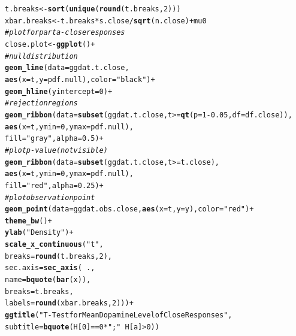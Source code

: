 \documentclass{article}\usepackage[]{graphicx}\usepackage[]{xcolor}
\makeatletter
\newcommand{\hlnum}[1]{\textcolor[rgb]{0.686,0.059,0.569}{#1}}%
\newcommand{\hlsng}[1]{\textcolor[rgb]{0.192,0.494,0.8}{#1}}%
\newcommand{\hlcom}[1]{\textcolor[rgb]{0.678,0.584,0.686}{\textit{#1}}}%
\newcommand{\hlopt}[1]{\textcolor[rgb]{0,0,0}{#1}}%
\newcommand{\hldef}[1]{\textcolor[rgb]{0.345,0.345,0.345}{#1}}%
\newcommand{\hlkwb}[1]{\textcolor[rgb]{0.69,0.353,0.396}{#1}}%
\newcommand{\hlkwc}[1]{\textcolor[rgb]{0.333,0.667,0.333}{#1}}%
\newcommand{\hlkwd}[1]{\textcolor[rgb]{0.737,0.353,0.396}{\textbf{#1}}}%
\newenvironment{kframe}{%
 \def\at@end@of@kframe{}%
 \ifinner\ifhmode%
  \def\at@end@of@kframe{\end{minipage}}%
  \begin{minipage}{\columnwidth}%
 \fi\fi%
 \def\FrameCommand##1{\hskip\@totalleftmargin \hskip-\fboxsep
 \colorbox{shadecolor}{##1}\hskip-\fboxsep
     \hskip-\linewidth \hskip-\@totalleftmargin \hskip\columnwidth}%
 \MakeFramed {\advance\hsize-\width
   \@totalleftmargin\z@ \linewidth\hsize
   \@setminipage}}%
 {\par\unskip\endMakeFramed%
 \at@end@of@kframe}
\newenvironment{knitrout}{}{} %
\makeatother
\begin{document}
\begin{enumerate}
\begin{enumerate}
\begin{knitrout}
\begin{kframe}
\begin{alltt}
\hldef{t.breaks} \hlkwb{<-} \hlkwd{sort}\hldef{(}\hlkwd{unique}\hldef{(}\hlkwd{round}\hldef{(t.breaks,} \hlnum{2}\hldef{)))}
\hldef{xbar.breaks} \hlkwb{<-} \hldef{t.breaks} \hlopt{*} \hldef{s.close}\hlopt{/}\hlkwd{sqrt}\hldef{(n.close)} \hlopt{+} \hldef{mu0}
\hlcom{#plot for part a - close responses}
\hldef{close.plot} \hlkwb{<-} \hlkwd{ggplot}\hldef{()} \hlopt{+}
\hlcom{# null distribution}
\hlkwd{geom_line}\hldef{(}\hlkwc{data}\hldef{=ggdat.t.close,}
          \hlkwd{aes}\hldef{(}\hlkwc{x}\hldef{=t,} \hlkwc{y}\hldef{=pdf.null),} \hlkwc{color} \hldef{=} \hlsng{"black"}\hldef{)}\hlopt{+}
\hlkwd{geom_hline}\hldef{(}\hlkwc{yintercept}\hldef{=}\hlnum{0}\hldef{)}\hlopt{+}
\hlcom{# rejection regions}
\hlkwd{geom_ribbon}\hldef{(}\hlkwc{data}\hldef{=}\hlkwd{subset}\hldef{(ggdat.t.close, t}\hlopt{>=}\hlkwd{qt}\hldef{(}\hlkwc{p} \hldef{=} \hlnum{1}\hlopt{-}\hlnum{0.05}\hldef{,} \hlkwc{df}\hldef{=df.close)),}
            \hlkwd{aes}\hldef{(}\hlkwc{x}\hldef{=t,} \hlkwc{ymin}\hldef{=}\hlnum{0}\hldef{,} \hlkwc{ymax}\hldef{=pdf.null),}
            \hlkwc{fill}\hldef{=}\hlsng{"gray"}\hldef{,} \hlkwc{alpha}\hldef{=}\hlnum{0.5}\hldef{)}\hlopt{+}
\hlcom{# plot p-value (not visible)}
\hlkwd{geom_ribbon}\hldef{(}\hlkwc{data}\hldef{=}\hlkwd{subset}\hldef{(ggdat.t.close, t}\hlopt{>=}\hldef{t.close),}
            \hlkwd{aes}\hldef{(}\hlkwc{x}\hldef{=t,} \hlkwc{ymin}\hldef{=}\hlnum{0}\hldef{,} \hlkwc{ymax}\hldef{=pdf.null),}
            \hlkwc{fill}\hldef{=}\hlsng{"red"}\hldef{,} \hlkwc{alpha}\hldef{=}\hlnum{0.25}\hldef{)}\hlopt{+}
\hlcom{# plot observation point}
\hlkwd{geom_point}\hldef{(}\hlkwc{data}\hldef{=ggdat.obs.close,} \hlkwd{aes}\hldef{(}\hlkwc{x}\hldef{=t,} \hlkwc{y}\hldef{=y),} \hlkwc{color}\hldef{=}\hlsng{"red"}\hldef{)}\hlopt{+}
\hlkwd{theme_bw}\hldef{()}\hlopt{+}
\hlkwd{ylab}\hldef{(}\hlsng{"Density"}\hldef{)}\hlopt{+}
\hlkwd{scale_x_continuous}\hldef{(}\hlsng{"t"}\hldef{,}
                   \hlkwc{breaks} \hldef{=} \hlkwd{round}\hldef{(t.breaks,}\hlnum{2}\hldef{),}
                   \hlkwc{sec.axis} \hldef{=} \hlkwd{sec_axis}\hldef{(}\hlopt{~}\hldef{.,}
                                       \hlkwc{name} \hldef{=} \hlkwd{bquote}\hldef{(}\hlkwd{bar}\hldef{(x)),}
                                       \hlkwc{breaks} \hldef{= t.breaks,}
                                       \hlkwc{labels} \hldef{=} \hlkwd{round}\hldef{(xbar.breaks,}\hlnum{2}\hldef{)))}\hlopt{+}
\hlkwd{ggtitle}\hldef{(}\hlsng{"T-Test for Mean Dopamine Level of Close Responses"}\hldef{,}
        \hlkwc{subtitle}\hldef{=}\hlkwd{bquote}\hldef{(H[}\hlnum{0}\hldef{]}\hlopt{==}\hlnum{0}\hlopt{*}\hlsng{";"}\hlopt{~}\hldef{H[a]}\hlopt{>}\hlnum{0}\hldef{))}

\end{alltt}
\end{kframe}
\end{knitrout}
\end{enumerate}
\end{enumerate}
\end{document}
